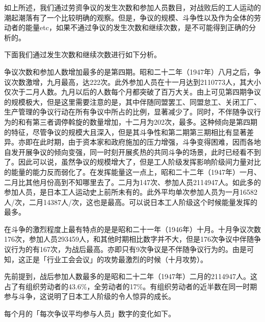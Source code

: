 \documentclass[a4paper,12pt]{article}
\begin{document}
如上所述，我们通过劳资争议的发生次数和参加人员数目，对战败后的工人运动的潮起潮落有了一个比较明确的观察。但是，争议的规模、斗争性以及作为全体的劳动者的能量etc，如果不通过争议的发生次数和继续次数，是不可能得到正确的分析的。

下面我们通过发生次数和继续次数进行如下分析。

争议次数和参加人数增加最多的是第四期。昭和二十二年（1947年）八月之后，争议次数激增，九月最高，达222次。此外参加人员在十一月达到2110773人，其大小仅次于二月人数。九月以后的人数每个月都突破了百万大关。由上可见第四期争议的规模极大，但是这里需要注意的是，其中伴随同盟罢工、同盟怠工、关闭工厂、生产管理的争议行动在所有争议中所占的比例，显著减少了。同时，不伴随争议行为的和有第三者调停斡旋的数量增加，十二月为202次，最多。这种倾向是第四期的特征，尽管争议的规模大且深入，但是其斗争性和第二期第三期相比有显著差异。亦即在此时期，由于资本家和政府施加的压力增强，斗争变得困难，因而各地自发开展争议的倾向变强，同一时刻开展炙热的共同斗争的场景，此时已经看不到了。因此可以说，虽然争议的规模增大了，但是工人阶级发挥影响阶级间力量对比的能量的能力反而弱化了。在发挥能量这一点上，昭和二十二年（1947年）一月、二月比其他月份高到不知哪里去了。二月为147次、参加人员2114947人。如此多的参加人员，是日本工人运动史上前所未有的。此外平均单次参加人员为一月16582人/次，二月14387人/次，这也是最高。可以说日本工人阶级这个时候能量发挥的最多。

在斗争的激烈程度上最有特点的是是昭和二十一年（1946年）十月。十月争议次数176次，参加人员293459人，和其他时期相比数字并不大，但是176次争议中伴随争议行为的有167次，为战后最高。亦即只有9次争议是不伴随争议行为的。由是可知，这正是「行业工会会议」的攻势最激烈的时候（十月攻势）。

先前提到，战后参加人数最多的是昭和二十二年（1947年）二月的2114947人。这占了有组织劳动者的43.6\%，全劳动者的17\%。有组织劳动者的近半数在同一时期参与斗争，这说明了日本工人阶级的令人惊异的成长。

每个月的「每次争议平均参与人员」数字的变化如下。
\end{document}
